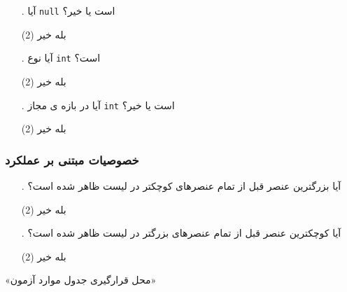 \documentclass[twoside]{article}
\newenvironment{answer}{}{\medskip}
\begin{document}
\begin{answer}
\begin{enumerate}
\begin{tasks}
	\end{tasks}
	\item[\lr{\textbf{G}}.]
آیا  \texttt{null} است یا خیر؟
	\begin{tasks}(2)
		\task[\lr{1}. ] بله
		\task[\lr{2}. ] خیر
	\end{tasks}
	\item[\lr{\textbf{H}}.]
آیا  نوع \texttt{int} است؟
	\begin{tasks}(2)
		\task[\lr{1}. ] بله
		\task[\lr{2}. ] خیر
	\end{tasks}
	\item[\lr{\textbf{I}}.]
آیا  در بازه ی مجاز \texttt{int} است یا خیر؟
	\begin{tasks}(2)
		\task[\lr{1}. ] بله
		\task[\lr{2}. ] خیر
	\end{tasks}
\end{enumerate}
\subsubsection*{خصوصیات مبتنی بر عملکرد}
\begin{enumerate}
	\item[\lr{\textbf{J}}.]
آیا بزرگترین عنصر قبل از تمام عنصرهای کوچکتر در لیست ظاهر شده است؟
	\begin{tasks}(2)
		\task[\lr{1}. ] بله
		\task[\lr{2}. ] خیر
	\end{tasks}
	\item[\lr{\textbf{K}}.]
آیا کوچکترین عنصر قبل از تمام عنصرهای بزرگتر در لیست ظاهر شده است؟
	\begin{tasks}(2)
		\task[\lr{1}. ] بله
		\task[\lr{2}. ] خیر
	\end{tasks}
\end{enumerate}

\begin{center}
«محل قرارگیری جدول موارد ‌آزمون»
\end{center}
\end{answer}
\end{document}
